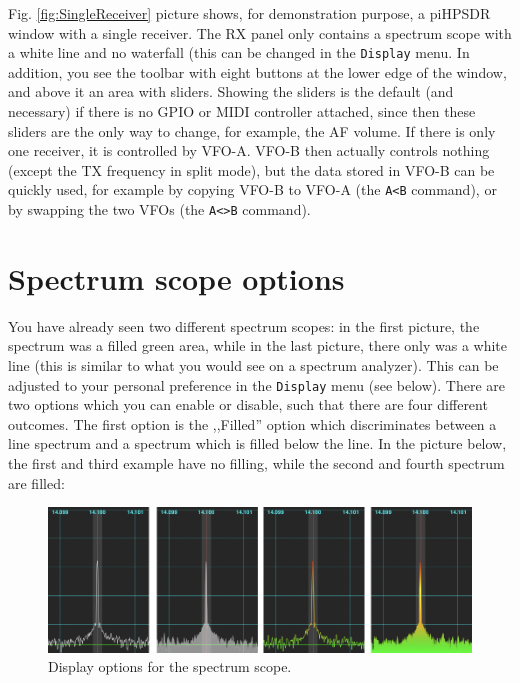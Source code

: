 \documentclass[12pt]{book}
\def\bltt#1{\texttt{\color{blue}#1}}
\begin{document}
 Fig. \ref{fig:SingleReceiver} picture shows, for demonstration purpose, a piHPSDR
 window with a single receiver.
 The RX panel only contains a
 spectrum scope with a white line and no waterfall (this can be changed in the
 \bltt{Display} menu. In addition, you see the toolbar
 with eight buttons at the lower edge of the window, and above
 it an area with sliders. Showing the sliders is the default
 (and necessary) if there is no GPIO or MIDI controller attached,
 since then these sliders are the only way to change, for example,
 the AF volume. If there is only one receiver, it is controlled
 by VFO-A. VFO-B then actually controls nothing (except the TX
 frequency in split mode), but the data stored in VFO-B can
 be quickly used, for example by copying VFO-B to VFO-A (the
 \bltt{A<B} command), or by swapping the two VFOs (the \bltt{A<>B} command).

\section{Spectrum scope options}
\label{sec:FillingGradient}

You have already seen two different spectrum scopes: in the first
picture, the  spectrum was a filled green area, while in the last
picture, there only was a white line (this is similar to what you
would see on a spectrum analyzer). This can be adjusted to your
personal preference in the \bltt{Display} menu (see below). There
are two options which you can enable or disable, such that there
are four different outcomes. The first option is the ,,Filled'' option
which discriminates between a line spectrum and a spectrum which is
filled below the line. In the picture below, the first and third
example have no filling, while the second and fourth spectrum
are filled:

\begin{figure}[ht]
\center
\includegraphics[width=12cm]{ScopeFilling.png}
\caption{Display options for the spectrum scope.}
\end{figure}
\end{document}
